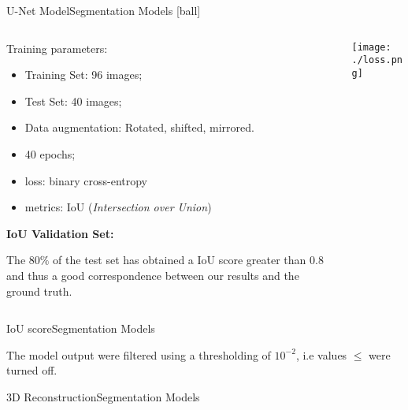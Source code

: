\documentclass{standalone}
\begin{document}
\begin{frame}{U-Net Model}{Segmentation Models}
  [ball]

  \begin{columns}
    \begin{column}{0.5\textwidth}

      \scriptsize{Training parameters:}
      \begin{itemize}
        \item Training Set: 96 images;
        \item Test Set: 40 images;
        \item Data augmentation:
              Rotated, shifted, mirrored.
        \item 40 epochs;
        \item loss: binary cross-entropy
        \item metrics: IoU (\emph{Intersection over Union})
      \end{itemize}

      \vspace{1cm}

      \scriptsize{\textbf{IoU Validation Set:}}

      \quad The $80\%$ of the test set has obtained a IoU score greater than $0.8$ and thus a good correspondence between our results and the ground truth.

    \end{column}
    \begin{column}{0.5\textwidth}
      \centering\texttt{[image: ./loss.png]}
    \end{column}
  \end{columns}

\end{frame}


\begin{frame}{IoU score}{Segmentation Models}

  \scriptsize{The model output were filtered using a thresholding of $10^{-2}$, i.e values $\leq$ were turned off.}

  \centering\def\svgwidth{\linewidth}

\end{frame}

\begin{frame}{3D Reconstruction}{Segmentation Models}

  \centering{}

\end{frame}
\end{document}
